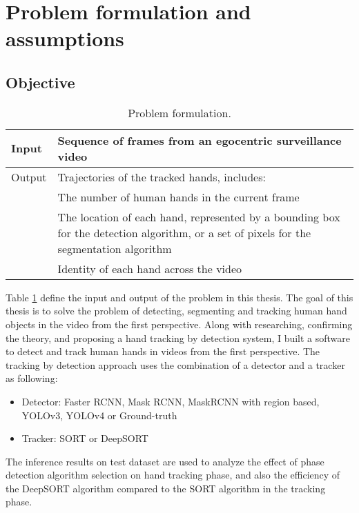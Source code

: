 \section{Problem formulation and assumptions}
\subsection{Objective}
\begin{table}
	\label{formulation}
	\begin{tabular}{|l|p{13cm}|}
		
		\hline 
		Input &  Sequence of frames from an egocentric surveillance video\\ 
		\hline 
		Output & Trajectories of the tracked hands, includes: \\
		& \tabitem The number of human hands in the current frame \\
		& \tabitem The location of each hand, represented by a bounding box for the detection algorithm, or a set of pixels for the segmentation algorithm \\
		& \tabitem Identity of each hand across the video
\\ 
		\hline 
	\end{tabular}
	\caption{Problem formulation.}
\end{table}
Table \ref{formulation} define the input and output of the problem in this thesis. The goal of this thesis is to solve the problem of detecting, segmenting and tracking human hand objects in the video from the first perspective. Along with researching, confirming the theory, and proposing a hand tracking by detection system, I built a software to detect and track human hands in videos from the first perspective. The tracking by detection approach uses the combination of a detector and a tracker as following:
\begin{itemize}
	\item Detector: Faster RCNN, Mask RCNN, MaskRCNN with region based, YOLOv3, YOLOv4 or Ground-truth
	\item Tracker: SORT or DeepSORT
\end{itemize}
The inference results on test dataset are used to analyze the effect of phase detection algorithm selection on hand tracking phase, and also the efficiency of the DeepSORT algorithm compared to the SORT algorithm in the tracking phase.
